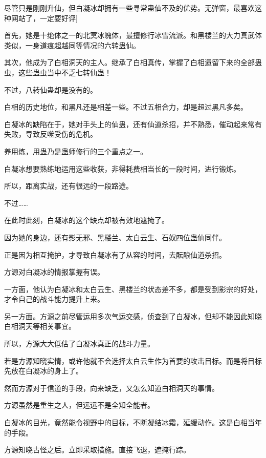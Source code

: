 
\begin{this_body}



尽管只是刚刚升仙，但白凝冰却拥有一些寻常蛊仙不及的优势。无弹窗，最喜欢这种网站了，一定要好评]

首先，她是十绝体之一的北冥冰魄体，最擅修行冰雪流派。和黑楼兰的大力真武体类似，一身道痕超越同等情况的六转蛊仙。

其次，他成为了白相洞天的主人。继承了白相真传，掌握了白相遗留下来的全部蛊虫，这些蛊虫当中不乏七转仙蛊！

不过，八转仙蛊却是没有的。

白相的历史地位，和黑凡还是相差一些。不过五相合力，却是超过黑凡多矣。

白凝冰的缺陷在于，她对手头上的仙蛊，还有仙道杀招，并不熟悉，催动起来常有失败，导致反噬受伤的危机。

养用炼，用蛊乃是蛊师修行的三个重点之一。

白凝冰想要熟练地运用这些收获，非得耗费相当长的一段时间，进行锻炼。

所以，距离实战，还有很远的一段路途。

不过……

在此时此刻，白凝冰的这个缺点却被有效地遮掩了。

因为她的身边，还有影无邪、黑楼兰、太白云生、石奴四位蛊仙同伴。

正是因为相互掩护，才导致白凝冰有了从容的时间，去酝酿仙道杀招。

方源对白凝冰的情报掌握有误。

一方面，他认为白凝冰和太白云生、黑楼兰的状态差不多，都是受到影宗的好处，才令自己的战斗能力提升上来。

另一方面。方源之前尽管运用多次气运交感，侦查到了白凝冰，但却不能因此知晓白相洞天等相关事宜。

所以，方源大大低估了白凝冰真正的战斗力量。

若是方源知晓实情，或许他就不会选择太白云生作为首要的攻击目标。而是将目标先放在白凝冰的身上了。

然而方源对于信道的手段，向来缺乏，又怎么知道白相洞天的事情。

方源虽然是重生之人，但远远不是全知全能者。

白凝冰的目光，竟然能令视野中的目标，不断凝结冰霜，延缓动作。这是白相当年的手段。

方源知晓古怪之后。立即采取措施。直接飞退，遮掩行踪。


\end{this_body}
